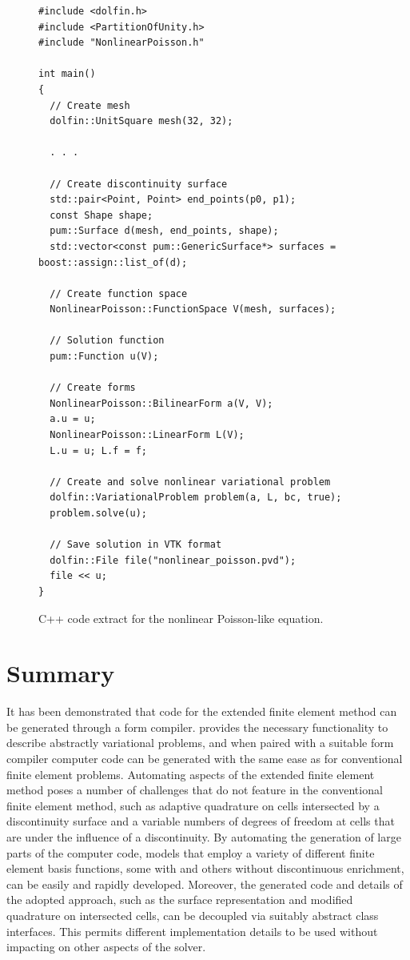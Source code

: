 \begin{figure}
\footnotesize
\begin{verbatim}
#include <dolfin.h>
#include <PartitionOfUnity.h>
#include "NonlinearPoisson.h"

int main()
{
  // Create mesh
  dolfin::UnitSquare mesh(32, 32);

  . . .

  // Create discontinuity surface
  std::pair<Point, Point> end_points(p0, p1);
  const Shape shape;
  pum::Surface d(mesh, end_points, shape);
  std::vector<const pum::GenericSurface*> surfaces = boost::assign::list_of(d);

  // Create function space
  NonlinearPoisson::FunctionSpace V(mesh, surfaces);

  // Solution function
  pum::Function u(V);

  // Create forms
  NonlinearPoisson::BilinearForm a(V, V);
  a.u = u;
  NonlinearPoisson::LinearForm L(V);
  L.u = u; L.f = f;

  // Create and solve nonlinear variational problem
  dolfin::VariationalProblem problem(a, L, bc, true);
  problem.solve(u);

  // Save solution in VTK format
  dolfin::File file("nonlinear_poisson.pvd");
  file << u;
}
\end{verbatim}
\caption{C++ code extract for the nonlinear Poisson-like equation.}
\label{nikbakht:fig:c++_nonlinear_poisson}
\end{figure}
\section{Summary}

It has been demonstrated that code for the extended finite element method
can be generated through a form compiler. \ufl{} provides the necessary
functionality to describe abstractly variational problems, and when paired
with a suitable form compiler computer code can be generated with the same
ease as for conventional finite element problems.  Automating aspects of
the extended finite element method poses a number of challenges that do
not feature in the conventional finite element method, such as adaptive
quadrature on cells intersected by a discontinuity surface and a variable
numbers of degrees of freedom at cells that are under the influence
of a discontinuity. By automating the generation of large parts of the
computer code, models that employ a variety of different finite element
basis functions, some with and others without discontinuous enrichment,
can be easily and rapidly developed.  Moreover, the generated code and
details of the adopted approach, such as the surface representation and
modified quadrature on intersected cells, can be decoupled via suitably
abstract class interfaces. This permits different implementation details
to be used without impacting on other aspects of the solver.

